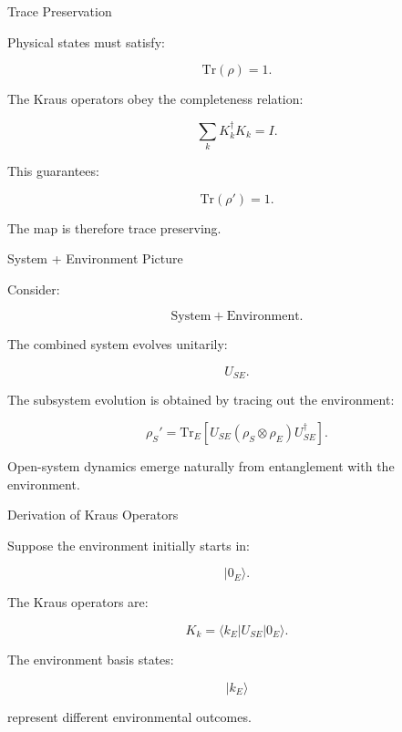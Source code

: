 \documentclass{beamer}
\begin{document}
\begin{frame}{Trace Preservation}

Physical states must satisfy:

\[
\mathrm{Tr}(\rho)=1.
\]

\vspace{0.4cm}

The Kraus operators obey the completeness relation:

\[
\sum_k
K_k^\dagger K_k
=
I.
\]

\vspace{0.4cm}

This guarantees:

\[
\mathrm{Tr}(\rho')=1.
\]

\vspace{0.3cm}

The map is therefore trace preserving.

\end{frame}

\begin{frame}{System + Environment Picture}

Consider:

\[
\text{System} + \text{Environment}.
\]

\vspace{0.4cm}

The combined system evolves unitarily:

\[
U_{SE}.
\]

\vspace{0.4cm}

The subsystem evolution is obtained by tracing out the environment:

\[
\rho_S'
=
\mathrm{Tr}_E
\left[
U_{SE}
(\rho_S \otimes \rho_E)
U_{SE}^\dagger
\right].
\]

\vspace{0.3cm}

Open-system dynamics emerge naturally from entanglement
with the environment.

\end{frame}

\begin{frame}{Derivation of Kraus Operators}

Suppose the environment initially starts in:

\[
|0_E\rangle.
\]

\vspace{0.4cm}

The Kraus operators are:

\[
K_k
=
\langle k_E|
U_{SE}
|0_E\rangle.
\]

\vspace{0.4cm}

The environment basis states:

\[
|k_E\rangle
\]

represent different environmental outcomes.

\end{frame}
\end{document}
